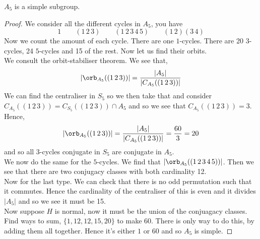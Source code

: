 \begin{nthm}
  $A_5$ is a simple subgroup.
\end{nthm}
\begin{proof}
  We consider all the different cycles in $A_5$, you have
  $$ 1 \qquad (1\,2\,3) \qquad (1\,2\,3\,4\,5) \qquad (1\,2)(3\,4) $$
  Now we count the amount of each cycle. There are one $1$-cycles. There are 20 $3$-cycles, 24 $5$-cycles and 15 of the rest. Now let us find their orbits. \\
  We consult the orbit-stabiliser theorem. We see that,
  $$ |\orb_{A_5}((1\,2\,3))| = \frac{|A_5|}{|C_{A_5}((1\,2\,3))|}$$
  We can find the centraliser in $S_5$ so we then take that and consider $C_{A_5}((1\,2\,3)) = C_{S_5}((1\,2\,3)) \cap A_5$ and so we see that $C_{A_5}((1\,2\,3)) = 3$. Hence,
  $$ |\orb_{A_5}((1\,2\,3))| = \frac{|A_5|}{|C_{A_5}((1\,2\,3))|} = \frac{60}{3} = 20 $$
  and so all $3$-cycles conjugate in $S_5$ are conjugate in $A_5$.\\
  We now do the same for the $5$-cycles. We find that $|\orb_{A_5}((1\,2\,3\,4\,5))|$. Then we see that there are two conjugacy classes with both cardinality 12.\\
  Now for the last type. We can check that there is no odd permutation such that it commutes. Hence the cardinality of the centraliser of this is even and it divides $|A_5|$ and so we see it must be 15.\\

  Now suppose $H$ is normal, now it must be the union of the conjuagacy classes. Find ways to sum, $\{1, 12, 12, 15, 20\}$ to make $60$. There is only way to do this, by adding them all together. Hence it's either $1$ or $60$ and so $A_5$ is simple.
\end{proof}

